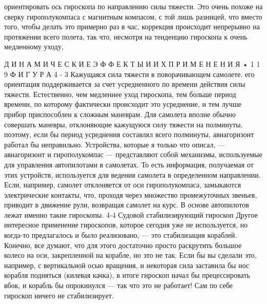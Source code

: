 \documentclass[10pt,oneside]{article}
\begin{document}
ориентировать ось гироскопа по направлению силы тяжести. Это очень похоже на сверку гирополукомпаса с магнитным компасом, с той лишь разницей, что вместо того, чтобы делать это примерно раз в час, коррекция происходит непрерывно на протяжении всего полета, так что, несмотря на тенденцию гироскопа к очень медленному уходу,\par

Д И Н А М И Ч Е С К И Е  Э Ф Ф Е К Т Ы  И  И Х  П Р И М Е Н Е Н И Я • 1 1 9 Ф И Г У Р А  4 - 3 Кажущаяся сила тяжести в поворачивающем самолете. его ориентация поддерживается за счет усредненного по времени действия силы тяжести. Естественно, чем медленнее уход гироскопа, тем больше период времени, по которому фактически происходит это усреднение, и тем лучше прибор приспособлен к сложным маневрам. Для самолета вполне обычно совершать маневры, отклоняющие кажущуюся силу тяжести на полминуты, поэтому, если бы период усреднения составлял всего полминуты, авиагоризонт работал бы неправильно. Устройства, которые я только что описал, --- авиагоризонт и гирополукомпас --- представляют собой механизмы, используемые для управления автопилотами в самолетах. То есть информация, получаемая от этих устройств, используется для ведения самолета в определенном направлении. Если, например, самолет отклоняется от оси гирополукомпаса, замыкаются электрические контакты, что, проходя через множество промежуточных звеньев, приводит в движение рули, возвращая самолет на курс. В основе автопилотов лежат именно такие гироскопы. 4-4 Судовой стабилизирующий гироскоп Другое интересное применение гироскопов, которое сегодня уже не используется, но когда-то предлагалось и было реализовано, --- это стабилизация кораблей. Конечно, все думают, что для этого достаточно просто раскрутить большое колесо на оси, закрепленной на корабле, но это не так. Если бы вы сделали это, например, с вертикальной осью вращения, и некоторая сила заставила бы нос корабля подняться (килевая качка), в итоге гироскоп начал бы прецессировать вбок, и корабль бы опрокинулся --- так что это не работает! Сам по себе гироскоп ничего не стабилизирует.\par
\end{document}
